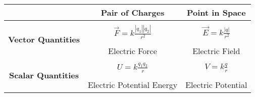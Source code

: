 \documentclass{article}
\begin{document}
        \begin{center}
        \begin{tabular}{|c|c|c|}
            \hline                                      & \textbf{Pair of Charges}                  & \textbf{Point in Space} \\\hline
            \multirow{4}{*}{\textbf{Vector Quantities}} &                                           & \\
                                                        & \(\displaystyle\vec{F} = k \frac{\left|q_1\right|\left|q_2\right|}{r^2}\) & \(\displaystyle\vec{E} = k \frac{\left|q\right|}{r^2}\) \\
                                                        &                                           & \\
                                                        & Electric Force                            & Electric Field \\\hline
            \multirow{4}{*}{\textbf{Scalar Quantities}} &                                           & \\
                                                        & \(\displaystyle U = k \frac{q_1 q_2}{r}\) & \(\displaystyle V = k \frac{q}{r}\) \\
                                                        &                                           & \\
                                                        & Electric Potential Energy                 & Electric Potential \\\hline
        \end{tabular}
        \end{center}
\end{document}
